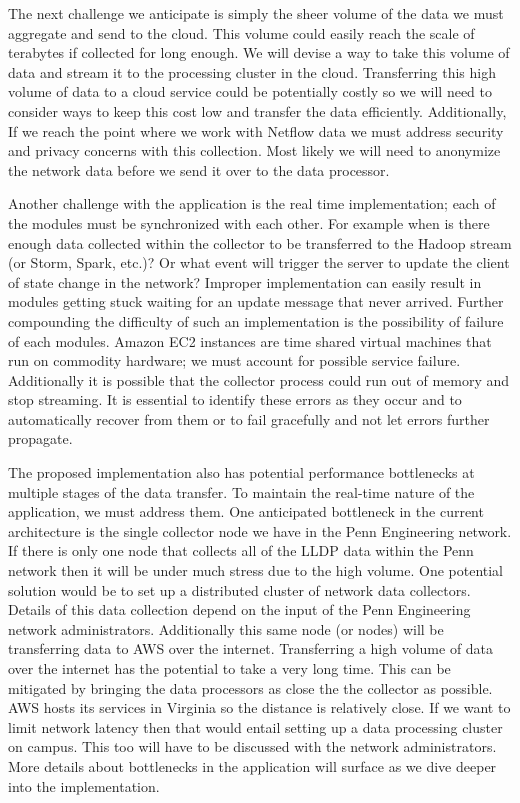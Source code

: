 \documentclass{sig-alternate}
\begin{document}
The next challenge we anticipate is simply the sheer volume of the data we must
aggregate and send to the cloud. This volume could easily reach the scale of
terabytes if collected for long enough. We will devise a way to take this volume
of data and stream it to the processing cluster in the cloud. Transferring this
high volume of data to a cloud service could be potentially costly so we will
need to consider ways to keep this cost low and transfer the data efficiently.
Additionally, If we reach the point where we work with Netflow data we must
address security and privacy concerns with this collection. Most likely we will
need to anonymize the network data before we send it over to the data processor.

Another challenge with the application is the real time implementation; each of
the modules must be synchronized with each other. For example when is there
enough data collected within the collector to be transferred to the Hadoop
stream (or Storm, Spark, etc.)? Or what event will trigger the server to update
the client of state change in the network? Improper implementation can easily
result in modules getting stuck waiting for an update message that never
arrived. Further compounding the difficulty of such an implementation is the
possibility of failure of each modules. Amazon EC2 instances are time shared
virtual machines that run on commodity hardware; we must account for possible
service failure. Additionally it is possible that the collector process could
run out of memory and stop streaming. It is essential to identify these errors
as they occur and to automatically recover from them or to fail gracefully and
not let errors further propagate.

The proposed implementation also has potential performance bottlenecks at
multiple stages of the data transfer. To maintain the real-time nature of the
application, we must address them. One anticipated bottleneck in the current
architecture is the single collector node we have in the Penn Engineering
network. If there is only one node that collects all of the LLDP data within the
Penn network then it will be under much stress due to the high volume. One
potential solution would be to set up a distributed cluster of network data
collectors. Details of this data collection depend on the input of the Penn
Engineering network administrators. Additionally this same node (or nodes) will
be transferring data to AWS over the internet. Transferring a high volume of
data over the internet has the potential to take a very long time. This can be
mitigated by bringing the data processors as close the the collector as
possible. AWS hosts its services in Virginia so the distance is relatively
close. If we want to limit network latency then that would entail setting up a
data processing cluster on campus. This too will have to be discussed with the
network administrators. More details about bottlenecks in the application will
surface as we dive deeper into the implementation.
\end{document}
